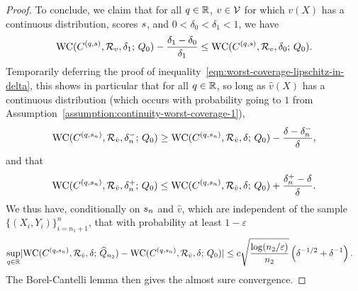 \begin{proof}
  To conclude, we claim that for all $q \in \mathbb{R}$, $v \in \mathcal{V}$ for which $v(X)$ has a continuous distribution, scores
  $s$, and $0<
  \delta_0 < \delta_1 < 1$, we have
  \begin{align}
    \label{eqn:worst-coverage-lipschitz-in-delta}
    \textup{WC}( C^{(q,s)}, \mathcal{R}_{v}, \delta_1; \, Q_0) - \frac{\delta_1 -
      \delta_0}{\delta_1}\le \textup{WC}( C^{(q,s)}, \mathcal{R}_{v}, \delta_0; \,
    Q_0).
  \end{align}
  Temporarily deferring the proof of
  inequality~\eqref{eqn:worst-coverage-lipschitz-in-delta},
  this shows in particular that for all $q \in \mathbb{R}$, so long as $\hat v(X)$ has a continuous distribution (which occurs with probability going to $1$ from Assumption~\ref{assumption:continuity-worst-coverage-1}),
  \begin{align*}
    \textup{WC}( C^{(q,s_n)}, \mathcal{R}_{\hat v}, \delta_n^-; \, Q_0) \ge \textup{WC}( C^{(q,s_n)}, \mathcal{R}_{\hat v}, \delta; \, Q_0) - \frac{ \delta-\delta_n^-}{\delta},
  \end{align*}
  and that
  \begin{align*}
    \textup{WC}( C^{(q,s_n)}, \mathcal{R}_{\hat v}, \delta_n^+; \, Q_0) \le \textup{WC}( C^{(q,s_n)}, \mathcal{R}_{\hat v}, \delta; \, Q_0) + \frac{\delta_n^+ - \delta}{\delta}.
  \end{align*}
  We thus have, conditionally on $s_n$ and $\hat v$,
  which are
  independent of the sample $\{ (X_i, Y_i) \}_{i=n_1+1}^{n}$,
  that with probability at least $1 - \varepsilon$
  \begin{align*}
    \sup_{q \in \mathbb{R}} \lvert \textup{WC}( C^{(q,s_n)}, \mathcal{R}_{\hat v}, \delta; \, \widehat{Q}_{n_2}) 
    - \textup{WC}( C^{(q,s_n)}, \mathcal{R}_{\hat v}, \delta; \, Q_0 )   \rvert
    & \le
    c \sqrt{\frac{\log(n_2/\varepsilon)}{n_2}}\left(\delta^{-1/2} + \delta^{-1} \right).
  \end{align*}
  The Borel-Cantelli lemma then gives the almost sure convergence.
  

\end{proof}
